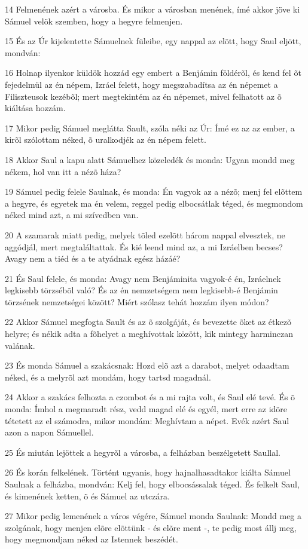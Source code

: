 \par 14 Felmenének azért a városba. És mikor a városban menének, ímé akkor jöve ki Sámuel velök szemben, hogy a hegyre felmenjen.
\par 15 És az Úr kijelentette Sámuelnek füleibe, egy nappal az elõtt, hogy Saul eljött, mondván:
\par 16 Holnap ilyenkor küldök hozzád egy embert a Benjámin földérõl, és kend fel õt fejedelmül az én népem, Izráel felett, hogy megszabadítsa az én népemet a Filiszteusok kezébõl; mert megtekintém az én népemet, mivel felhatott az õ kiáltása hozzám.
\par 17 Mikor pedig Sámuel meglátta Sault, szóla néki az Úr: Ímé ez az az ember, a kirõl szólottam néked, õ uralkodjék az én népem felett.
\par 18 Akkor Saul a kapu alatt Sámuelhez közeledék és monda: Ugyan mondd meg nékem, hol van itt a nézõ háza?
\par 19 Sámuel pedig felele Saulnak, és monda: Én vagyok az a nézõ; menj fel elõttem a hegyre, és egyetek ma én velem, reggel pedig elbocsátlak téged, és megmondom néked mind azt, a mi szívedben van.
\par 20 A szamarak miatt pedig, melyek tõled ezelõtt három nappal elvesztek, ne aggódjál, mert megtaláltattak. És kié leend mind az, a mi Izráelben becses? Avagy nem a tiéd és a te atyádnak egész házáé?
\par 21 És Saul felele, és monda: Avagy nem Benjáminita vagyok-é én, Izráelnek legkisebb törzsébõl való? És az én nemzetségem nem legkisebb-é Benjámin törzsének nemzetségei között? Miért szólasz tehát hozzám ilyen módon?
\par 22 Akkor Sámuel megfogta Sault és az õ szolgáját, és bevezette õket az étkezõ helyre; és nékik adta a fõhelyet a meghívottak között, kik mintegy harminczan valának.
\par 23 És monda Sámuel a szakácsnak: Hozd elõ azt a darabot, melyet odaadtam néked, és a melyrõl azt mondám, hogy tartsd magadnál.
\par 24 Akkor a szakács felhozta a czombot és a mi rajta volt, és Saul elé tevé. És õ monda: Ímhol a megmaradt rész, vedd magad elé és egyél, mert erre az idõre tétetett az el számodra, mikor mondám: Meghívtam a népet. Evék azért Saul azon a napon Sámuellel.
\par 25 És miután lejöttek a hegyrõl a városba, a felházban beszélgetett Saullal.
\par 26 És korán felkelének. Történt ugyanis, hogy hajnalhasadtakor kiálta Sámuel Saulnak a felházba, mondván: Kelj fel, hogy elbocsássalak téged. És felkelt Saul, és kimenének ketten, õ és Sámuel az utczára.
\par 27 Mikor pedig lemenének a város végére, Sámuel monda Saulnak: Mondd meg a szolgának, hogy menjen elõre elõttünk - és elõre ment -, te pedig most állj meg, hogy megmondjam néked az Istennek beszédét.

